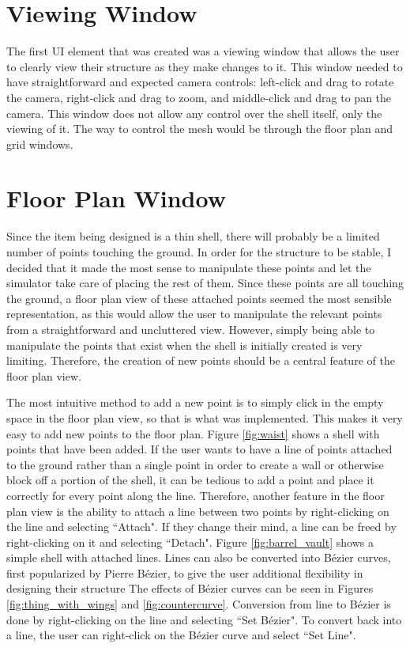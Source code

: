 \documentclass{thesis}
\begin{document}
\section{Viewing Window}
The first UI element that was created was a viewing window that allows the user to clearly view their structure as they make changes
to it. This window needed to have straightforward and expected camera controls: left-click and drag to rotate the camera, right-click and
drag to zoom, and middle-click and drag to pan the camera.  This window does not allow any control over the shell itself, only the viewing
of it.  The way to control the mesh would be through the floor plan and grid windows.

\section{Floor Plan Window}
Since the item being designed is a thin shell, there will probably be a limited number of points touching the ground.  In order
for the structure to be stable, I decided that it made the most sense to manipulate these points and let the simulator take care
of placing the rest of them.  Since these points are all touching the ground, a floor plan view of these attached points seemed the
most sensible representation, as this would allow the user to manipulate the relevant points from a straightforward and uncluttered view.
However, simply being able to manipulate the points that exist when the shell is initially created is very limiting.  Therefore,
the creation of new points should be a central feature of the floor plan view.

The most intuitive method to add a new point is to simply click in the empty space in the floor plan view, so that is what was
implemented.  This makes it very easy to add new points to the floor plan.  Figure \ref{fig:waist} shows a shell with points that
have been added.  If the user wants to have a line of points attached to the ground rather than a single point in order to create
a wall or otherwise block off a portion of the shell, it can be tedious to add a point and place it correctly for every point along
the line.  Therefore, another feature in the floor plan view is the ability to attach a line between two points by right-clicking on
the line and selecting ``Attach".  If they change their mind, a line can be freed by right-clicking on it and selecting ``Detach".
Figure \ref{fig:barrel_vault} shows a simple shell with attached lines.  Lines can also be converted into B\'{e}zier curves, first
popularized by Pierre B\'{e}zier, to give the user additional flexibility in designing their structure
The effects of B\'{e}zier curves can be seen in Figures \ref{fig:thing_with_wings} and
\ref{fig:countercurve}.  Conversion from line to B\'{e}zier is done by right-clicking on the line and selecting ``Set B\'{e}zier".  To
convert back into a line, the user can right-click on the B\'{e}zier curve and select ``Set Line".
\end{document}

